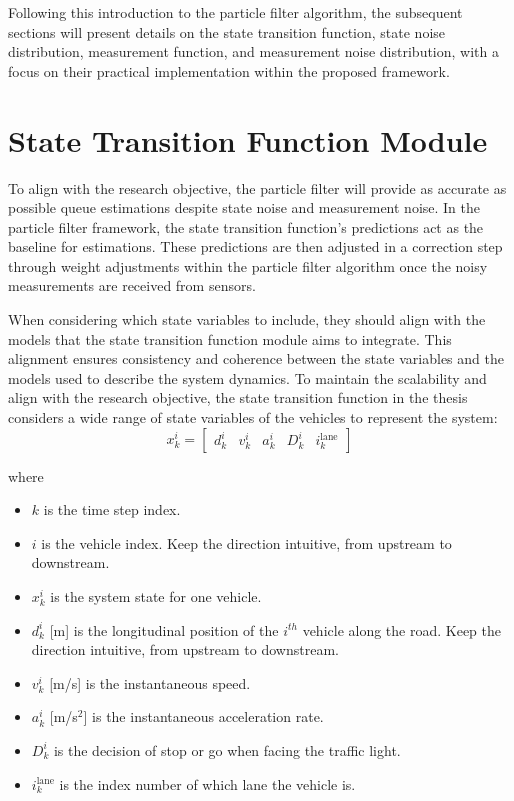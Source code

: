 Following this introduction to the particle filter algorithm, the subsequent sections will present details on the state transition function, state noise distribution, measurement function, and measurement noise distribution, with a focus on their practical implementation within the proposed framework.


\section{State Transition Function Module}\label{State Transition Function}
To align with the research objective, the particle filter will provide as accurate as possible queue estimations despite state noise and measurement noise. In the particle filter framework, the state transition function's predictions act as the baseline for estimations. These predictions are then adjusted in a correction step through weight adjustments within the particle filter algorithm once the noisy measurements are received from sensors.

When considering which state variables to include, they should align with the models that the state transition function module aims to integrate. This alignment ensures consistency and coherence between the state variables and the models used to describe the system dynamics. To maintain the scalability and align with the research objective, the state transition function in the thesis considers a wide range of state variables of the vehicles to represent the system: 
\begin{equation}\label{state variables}
    x_k^i = \begin{bmatrix}
d_k^i & v_k^i & a_k^i  & D_{k}^i & i_k^{\text{lane}}
\end{bmatrix}
\end{equation}

where
\begin{itemize}
    \item $k$ is the time step index.
    \item $i$ is the vehicle index. Keep the direction intuitive, from upstream to downstream.
    \item $x_k^i$ is the system state for one vehicle. 
    \item $d_k^i$ [m] is the longitudinal position of the  $i^{th}$ vehicle along the road. Keep the direction intuitive, from upstream to downstream.
    \item $v_k^i$ [m/s] is the instantaneous speed.
    \item $a_k^i$ [m/s$^2$] is the instantaneous acceleration rate.
    \item $D_{k}^i$ is the decision of stop or go when facing the traffic light.
    \item $i_k^{\text{lane}}$ is the index number of which lane the vehicle is.
\end{itemize}

